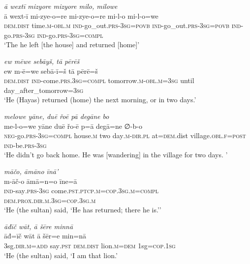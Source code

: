 \ea \label{ŽH.106}
\textit{ā wextī mizyore mizyore milo, milowe} \\ 
\gll ā wext-ī mi-zye-o=re mi-zye-o=re mi-l-o mi-l-o=we \\ 
 \textsc{dem.dist} time\textsc{.m}\textsc{-obl}\textsc{.m} \textsc{ind-}go\_out\textsc{.prs}\textsc{-3sg}\textsc{=\textsc{povb}} \textsc{ind-}go\_out\textsc{.prs}\textsc{-3sg}\textsc{=\textsc{povb}} \textsc{ind-}go\textsc{.prs}\textsc{-3sg} \textsc{ind-}go\textsc{.prs}\textsc{-3sg}\textsc{=compl} \\ 
\glt `The he left [the house] and returned [home]'
\z 
 
\ea \label{ŽH.107}
\textit{ew mēwe sebāyš, tā pērēš} \\ 
\gll ew m-ē=we sebā-ī=š tā pērē=š \\ 
 \textsc{dem.dist} \textsc{ind-}come\textsc{.prs}\textsc{.3sg}\textsc{=compl} tomorrow\textsc{.m}\textsc{-obl}\textsc{.m}\textsc{=3sg} until day\_after\_tomorrow\textsc{=3sg} \\ 
\glt `He (Hayas) returned (home) the next morning, or in two days.'
\z 
 
\ea \label{ŽH.109}
\textit{melowe yāne, duē řoē pā degāne bo} \\ 
\gll me-l-o=we yāne duē řo-ē p=ā degā=ne ∅-b-o \\ 
 \textsc{neg-}go\textsc{.prs}\textsc{-3sg}\textsc{=compl} house\textsc{.m} two day\textsc{.m}\textsc{-dir}\textsc{.pl} at\textsc{=dem}.dist village\textsc{.obl}\textsc{\textsc{.f}}\textsc{=\textsc{post}} \textsc{ind-}be\textsc{.prs}\textsc{-3sg} \\ 
\glt `He didn’t go back home. He was [wandering] in the village for two days. '
\z 
 
\ea \label{ŽH.111}
\textit{māčo, āmāno īnā’} \\ 
\gll m-āč-o āmā=n=o īne=ā \\ 
 \textsc{ind-}say\textsc{.prs}\textsc{-3sg} come\textsc{.pst}\textsc{.ptcp}\textsc{.m}\textsc{=cop}\textsc{.3sg}\textsc{.m}\textsc{=compl} \textsc{dem.prox}\textsc{.dir}\textsc{.m}\textsc{.3sg}\textsc{=cop}\textsc{.3sg}\textsc{.m} \\ 
\glt `He (the sultan) said, ‘He has returned; there he is.’'
\z 
 
\ea \label{ŽH.116}
\textit{āđīč wāt, ā šēre minnā} \\ 
\gll āđ=īč wāt ā šēr=e min=nā \\ 
 3sg\textsc{.dir}\textsc{.m}\textsc{=add} say\textsc{.pst} \textsc{dem.dist} lion\textsc{.m}\textsc{=dem} 1sg\textsc{=cop}\textsc{.1sg} \\ 
\glt `He (the sultan) said, ‘I am that lion.'
\z 
 
